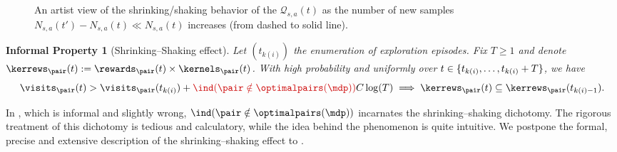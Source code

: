 \documentclass[preprint,cleveref,12pt]{colt2025}
\newtheorem{informalproperty}[informalproperty]{Informal Property}
\DeclarePairedDelimiter{\braces}{\{}{\}}	%
\DeclarePairedDelimiter{\parens}{(}{)}	%
\newcommand{\indic}[1]{\ind\parens{#1}}
\def\indicator{\indic}
\def\model{\mdp}
\def\optpairs{\optimalpairs}
\begin{document}
\begin{figure}[h]
        \caption{
            \label{figure_shrinking_shaking}
            An artist view of the shrinking/shaking behavior of the $\mathcal{Q}_{s,a}(t)$ as the number of new samples $N_{s,a}(t') - N_{s,a}(t) \ll N_{s,a}(t)$ increases (from dashed to solid line). 
        }
        \vspace{-2em}
    \end{figure}

    \begin{informalproperty}[{Shrinking--Shaking} effect]
    \label{lemma_informal_shrinking_shaking}
        Let $(t_{k(i)})$ the enumeration of exploration episodes.
        Fix $T \ge 1$ and denote $\kerrews_\pair(t) := \rewards_\pair(t) \times \kernels_\pair(t)$.
        With high probability and uniformly over $t \in \braces{t_{k(i)}, \ldots, t_{k(i)} + T}$, we have
        \begin{equation*}
            \visits_\pair (t) 
            > 
            \visits_\pair (t_{k(i)})
            + 
            {
                \color{red!80!black}
                \indicator{\pair \notin \optpairs(\model)} 
            }
            C \log(T)
            \implies
            \kerrews_\pair (t) \subseteq \kerrews_\pair (t_{k(i)-1})
            .
        \end{equation*}
    \end{informalproperty}
    
    In , which is informal and slightly wrong, \textcolor{red!80!black}{$\indicator{\pair \notin \optpairs(\model)}$} incarnates the shrinking--shaking dichotomy. 
    The rigorous treatment of this dichotomy is tedious and calculatory, while the idea behind the phenomenon is quite intuitive.
    We postpone the formal, precise and extensive description of the shrinking--shaking effect to .
\end{document}
